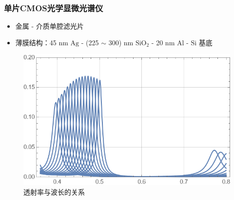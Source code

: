 \begin{frame}[c]
    \frametitle{单片CMOS光学显微光谱仪}
    \begin{itemize}
        \item 金属 - 介质单腔滤光片
        \item 薄膜结构：45 nm $\mathrm{Ag}$ - (225 $\sim$ 300) nm $\mathrm{SiO_2}$ - 20 nm $\mathrm{Al}$ - $\mathrm{Si}$ 基底
    \end{itemize}
    \begin{figure}[H] %
        \centering %
        \includegraphics[width=1.\textwidth]{figures/Single-chip CMOS optical microspectrometer_3.png} %
        \caption{透射率与波长的关系} %
    \end{figure}
\end{frame}